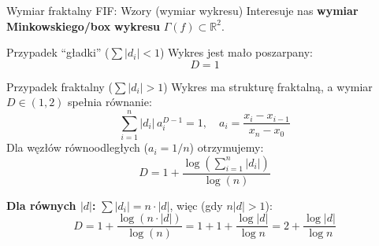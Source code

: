 \documentclass[10pt]{beamer}
\begin{document}
\begin{frame}{Wymiar fraktalny FIF: Wzory (wymiar wykresu)}
    Interesuje nas \textbf{wymiar Minkowskiego/box} \textbf{wykresu} $\Gamma(f)\subset\mathbb{R}^2$.

    \vspace{0.3cm}
    \begin{block}{Przypadek ``gładki'' ($\sum |d_i| < 1$)}
        Wykres jest mało poszarpany:
        \[
        D = 1
        \]
    \end{block}

    \begin{block}{Przypadek fraktalny ($\sum |d_i| > 1$)}
        Wykres ma strukturę fraktalną, a wymiar $D\in(1,2)$ spełnia równanie:
        \[
        \sum_{i=1}^{n} |d_i|\, a_i^{D-1} = 1, \quad a_i = \frac{x_i-x_{i-1}}{x_n-x_0}
        \]
        \vspace{0.1cm}
        Dla węzłów równoodległych ($a_i=1/n$) otrzymujemy:
        \[
        D = 1 + \frac{\log\left(\sum_{i=1}^{n} |d_i|\right)}{\log(n)}
        \]
    \end{block}

    \vspace{0.2cm}
    \textbf{Dla równych $|d|$:} $\sum |d_i| = n \cdot |d|$, więc (gdy $n|d|>1$):
    \[
    D = 1 + \frac{\log(n \cdot |d|)}{\log(n)} = 1 + 1 + \frac{\log |d|}{\log n} = 2 + \frac{\log |d|}{\log n}
    \]
\end{frame}
\end{document}
